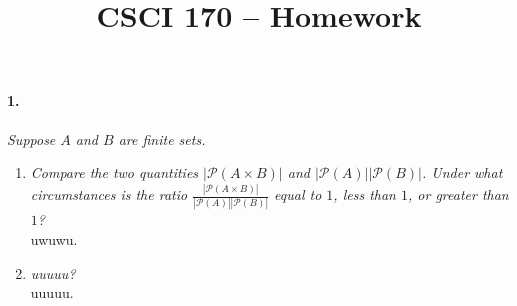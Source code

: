\documentclass[12pt]{article}
\title{\vspace{-2\baselineskip}CSCI 170 -- Homework \homework}
\author{\name}
\date{\duedate}
\newcommand{\qa}{\\[0.5\baselineskip]}  %
\newcommand{\ps}{\mathcal{P}}
\begin{document}
\maketitle

\paragraph{1.}
\textit{Suppose $A$ and $B$ are finite sets.}
\begin{enumerate}[label=\textbf{\alph*.}]
    \item \textit{Compare the two quantities $|\ps(A \times B)|$ and $|\ps(A)||\ps(B)|$.
    Under what circumstances is the ratio $\frac{|\ps(A \times B)|}{|\ps(A)||\ps(B)|}$
    equal to $1$, less than $1$, or greater than $1$?
    } \qa
    uwuwu.
    \item \textit{uuuuu?} \qa
    uuuuu.
\end{enumerate}
\end{document}
